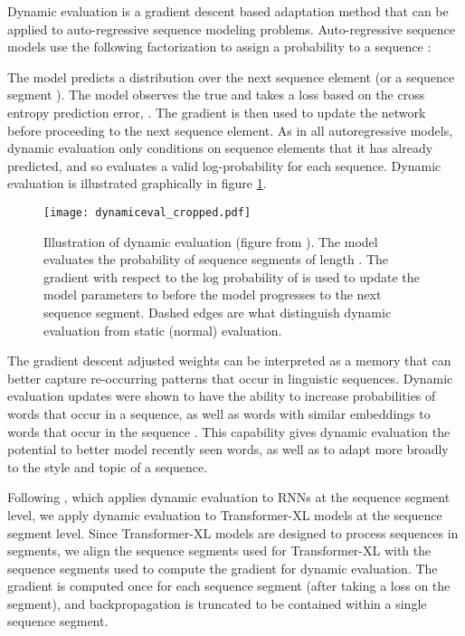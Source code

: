 \documentclass{article} \usepackage{iclr2018_conference,times}
\begin{document}
Dynamic evaluation is a gradient descent based adaptation method that can be applied to auto-regressive sequence modeling problems. Auto-regressive sequence models use the following factorization to assign a probability to a sequence :



The model predicts a distribution over the next sequence element  (or a sequence segment ).  The model observes the true  and takes a loss based on the cross entropy prediction error, . The gradient  is then used to update the network before proceeding to the next sequence element. As in all autoregressive models, dynamic evaluation only conditions on sequence elements that it has already predicted, and so evaluates a valid log-probability for each sequence. Dynamic evaluation is illustrated graphically in figure \ref{fig:dynamiceval}.

\begin{figure}[tb]
  \centering
  \texttt{[image: dynamiceval\_cropped.pdf]}
  \caption{Illustration of dynamic evaluation (figure from \citet{krause2018}). The model evaluates the probability of sequence segments  of length . The gradient  with respect to the log probability of  is used to update the model parameters  to  before the model progresses to the next sequence segment. Dashed edges are what distinguish dynamic evaluation from static (normal) evaluation. }
  \label{fig:dynamiceval}
\end{figure}

The gradient descent adjusted weights can be interpreted as a memory that can better capture re-occurring patterns that occur in linguistic sequences. Dynamic evaluation updates were shown to have the ability to increase probabilities of words that occur in a sequence, as well as words with similar embeddings to words that occur in the sequence \citep{krause2018}. This capability gives dynamic evaluation the potential to better model recently seen words, as well as to adapt more broadly to the style and topic of a sequence.

Following \citet{krause2018}, which applies dynamic evaluation to RNNs at the sequence segment level, we apply dynamic evaluation to Transformer-XL models at the sequence segment level. 
Since Transformer-XL models are designed to process sequences in segments, we align the sequence segments used for Transformer-XL \citep{dai2019} with the sequence segments used to compute the gradient for dynamic evaluation. The gradient is computed once for each sequence segment (after taking a loss on the segment), and backpropagation is truncated to be contained within a single sequence segment.
\end{document}
